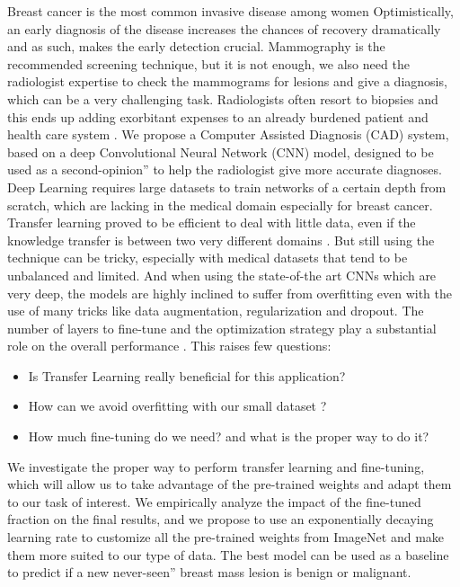 \documentclass{article}
\begin{document}
Breast cancer is the most common invasive disease among women \citep{siegel2014cancer}
Optimistically, an early diagnosis of the disease increases the chances of recovery dramatically and as such, makes the early detection crucial. Mammography is the recommended screening technique, but it is not enough, we also need the radiologist expertise to check the mammograms for lesions and give a diagnosis, which can be a very challenging task\citep{kerlikowske2000performance}.
Radiologists often resort to biopsies and this ends up adding exorbitant expenses to an already burdened patient and health care system \citep{sickles1991periodic}.
We propose a Computer Assisted Diagnosis (CAD) system, based on a deep Convolutional Neural Network (CNN) model, designed to be used as a second-opinion” to help the radiologist give more accurate diagnoses. Deep Learning requires large datasets to train networks of a certain depth from scratch, which are lacking in the medical domain especially for breast cancer. Transfer learning proved to be efficient to deal with little data, even if the knowledge transfer is between two very different domains \citep{shin2016deep}.
But still using the technique can be tricky, especially with medical datasets that tend to be unbalanced and limited. And when using the state-of-the art CNNs which are very deep, the models are highly inclined to suffer from overfitting even with the use of many tricks like data augmentation, regularization and dropout.
The number of layers to fine-tune and the optimization strategy play a substantial role on the overall performance  \citep{yosinski2014transferable}. This raises few questions:
\begin{itemize}
\item Is Transfer Learning really beneficial for this application?
\item How can we avoid overfitting with our small dataset ?
\item How much fine-tuning do we need? and what is the proper way to do it?
\end{itemize}
We investigate the proper way to perform transfer learning and fine-tuning, which will allow us to take advantage of the pre-trained weights and adapt them to our task of interest. We empirically analyze the impact of the fine-tuned fraction on the final results, and we propose to use an exponentially decaying learning rate to customize all the pre-trained weights from ImageNet\citep{deng2009imagenet} and make them more suited to our type of data. The best model can be used as a baseline to predict if a new never-seen” breast mass lesion is benign or malignant.
\end{document}
